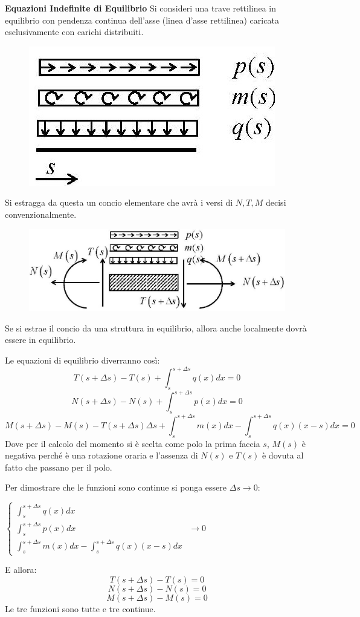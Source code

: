 \documentclass{article}
\begin{document}
\begin{adjustwidth}{2in}{}
{\Large \textbf{Equazioni Indefinite di Equilibrio}} \mbox{} \newline	
	Si consideri una trave rettilinea in equilibrio con pendenza continua dell’asse (linea d'asse rettilinea) caricata esclusivamente
	con carichi distribuiti.
		
\begin{figure}[H]
	\centering
	\includegraphics[width=0.15\linewidth]{"immagini/1.PARTE5_Pagina_08 (2)"}
\end{figure}

	Si estragga da questa un concio elementare che avrà i versi di $N, T, M$ decisi convenzionalmente.
	
\begin{figure}[H]
	\centering
	\includegraphics[width=0.4\linewidth]{"immagini/1.PARTE5_Pagina_08"}
\end{figure}
	Se si estrae il concio da una struttura in equilibrio, allora anche localmente dovrà essere in equilibrio. 
	
	Le equazioni di equilibrio diverranno così:
	\[
	T(s+\Delta s) - T(s) + \int_{s}^{s+\Delta s} q(x)dx = 0
	\]
	\[
	N(s+\Delta s) - N(s) + \int_{s}^{s+\Delta s} p(x)dx = 0
	\]
	\[
	M(s+\Delta s) - M(s) -T(s+\Delta s)\Delta s + \int_{s}^{s+\Delta s} m(x)dx - \int_{s}^{s+\Delta s} q(x)(x-s)dx = 0
	\]
	Dove per il calcolo del momento si è scelta come polo la prima faccia $s$, $M(s)$ è negativa perché è una rotazione oraria e l'assenza di $ N(s) $ e $ T(s) $ è dovuta al fatto che passano per il polo. 

	Per dimostrare che le funzioni sono continue si ponga essere $\Delta s\rightarrow 0$: \newline
	\begin{center}
		\mbox{$ \begin{cases}
			\int_{s}^{s+\Delta s} q(x)dx \\
			\int_{s}^{s+\Delta s} p(x)dx \\
			\int_{s}^{s+\Delta s} m(x)dx - \int_{s}^{s+\Delta s} q(x)(x-s)dx 
		\end{cases}$} $	\rightarrow 0$ \newline
	\end{center}
	E allora: 
		\[
	T(s+\Delta s) - T(s)  = 0
	\]
	\[
	N(s+\Delta s) - N(s)  = 0
	\]
	\[
	M(s+\Delta s) - M(s)  = 0
	\]
	Le tre funzioni sono tutte e tre continue. \newline 
	

\end{adjustwidth}
\end{document}
